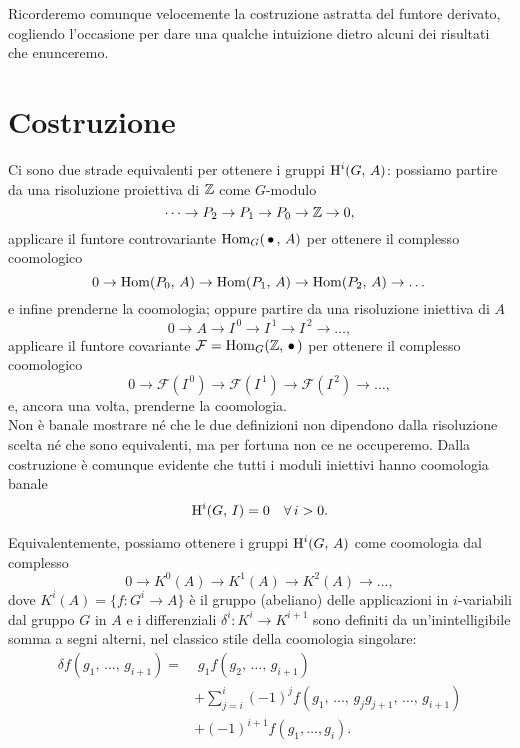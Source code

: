 Ricorderemo comunque velocemente la costruzione astratta del funtore derivato, cogliendo l'occasione per dare una qualche intuizione dietro alcuni dei risultati che enunceremo.

\section{Costruzione}
Ci sono due strade equivalenti per ottenere i gruppi $ \operatorname{H}^i(G, \, A) $: possiamo partire da una risoluzione proiettiva di $ \mathbb{Z} $ come $ G $-modulo
\[ \dots \to P_2 \to P_1 \to P_0 \to \mathbb{Z} \to 0, \]
applicare il funtore controvariante $ \operatorname{Hom}_G(\, \bullet\,, \, A) $ per ottenere il complesso coomologico
\[ 0 \to \operatorname{Hom}(P_0, \, A) \to \operatorname{Hom}(P_1, \, A) \to \operatorname{Hom}(P_2, \, A) \to \dots \]
e infine prenderne la coomologia; oppure partire da una risoluzione iniettiva di $ A $
\[ 0 \to A \to I^{\,0} \to I^{\,1} \to I^{\,2} \to \dots, \]
applicare il funtore covariante $ \mathcal{F} = \operatorname{Hom}_G(\mathbb{Z}, \, \bullet \, ) $ per ottenere il complesso coomologico
\[ 0 \to \mathcal{F}\left(I^{\,0}\right) \to \mathcal{F}\left(I^{\,1}\right) \to \mathcal{F}\left(I^{\,2}\right) \to \dots, \]
e, ancora una volta, prenderne la coomologia. \\

Non è banale mostrare né che le due definizioni non dipendono dalla risoluzione scelta né che sono equivalenti, ma per fortuna non ce ne occuperemo. Dalla costruzione è comunque evidente che tutti i moduli iniettivi hanno coomologia banale
\begin{equation}\label{injban}
	\operatorname{H}^i(G, \, I) = 0 \quad \forall \, i > 0.
\end{equation}

Equivalentemente, possiamo ottenere i gruppi $ \operatorname{H}^i(G, \, A) $ come coomologia dal complesso
\[ 0 \to K^0(A) \to K^1(A) \to K^2 (A) \to \dots, \]
dove $ K^i(A) = \{ f \colon G^i \to A\} $ è il gruppo (abeliano) delle applicazioni in $ i $-variabili dal gruppo $ G $ in $ A $ e i differenziali $ \delta^i \colon K^i \to K^{i+1} $ sono definiti da un'inintelligibile somma a segni alterni, nel classico stile della coomologia singolare:
\begin{align*}
	\delta f(g_1, \, \dots, \, g_{i+1}) = & \;  g_1 f(g_2, \, \dots, \, g_{i+1}) \\ & + \sum_{j = i}^{i} (-1)^j f(g_1, \, \dots, \, g_jg_{j+1}, \, \dots, \, g_{i+1}) \\ & + (-1)^{i+1} f(g_1, \dots, g_i).
\end{align*}

